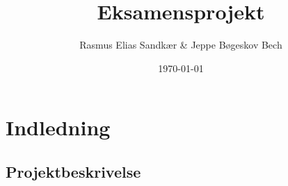 \documentclass[11pt]{article}
\author{Rasmus Elias Sandkær \& Jeppe Bøgeskov Bech}
\date{\today}
\title{Eksamensprojekt}
\begin{document}
    
    \restoregeometry
    \tableofcontents
    \newpage

    \section{Indledning}
    


    \newpage
    \printbibliography[heading=bibintoc,title={Litteraturliste}]

    \newpage
    \begin{appendices}\newpage
        \renewcommand{\thesubsection}{\Alph{subsection}}
        \subsection{Projektbeskrivelse \label{apx:projektbeskrivels}} \newpage
        \renewcommand*{\thepage}{A\arabic{page}}
        
    \end{appendices}
\end{document}
